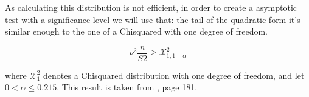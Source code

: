 As calculating this distribution is not efficient, in order to create a asymptotic test with a significance level we will use that: the tail of the quadratic form it's similar enough to the one of a Chisquared with one degree of freedom.

$$
\nu^{2}\frac{n}{S2} \geq \mathcal{X}_{1;1-\alpha}^{2}
$$ 

where $\mathcal{X}_{1}^{2}$ denotes a Chisquared distribution with one degree of freedom, and let $0<\alpha\leq0.215$. This result is taken from \cite{DCOV_Chisq}, page 181.





